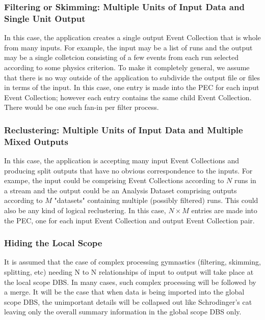 \documentclass{cmspaper}
\begin{document}
\subsubsection{Filtering or Skimming: Multiple Units of Input Data and Single 
Unit Output}

In this case, the application creates a single output Event Collection
that is whole from many inputs.  For example, the input may be a list
of runs and the output may be a single colletcion consisting of a few
events from each run selected according to some physics criterion.
To make it completely general, we assume that there is no way outside
of the application to subdivide the output file or files in terms of
the input.  In this case, one entry is made into the PEC for each input
Event Collection; however each entry contains the same child Event
Collection. There would be one such fan-in per filter process.

\subsubsection{Reclustering: Multiple Units of Input Data and Multiple Mixed Outputs}

In this case, the application is accepting many input Event Collections
and producing split outputs that have no obvious correspondence to the
inputs.  For exampe, the input could be comprising Event Collections
according to $N$ runs in a stream and the output could be an Analysis
Dataset comprising outputs according to $M$ "datasets" containing
multiple (possibly filtered) runs.  This could also be any kind of logical
reclustering.  In this case, $N \times M$ entries are made into the PEC,
one for each input Event Collection and output Event Collection pair.

\subsubsection{Hiding the Local Scope}

It is assumed that the case of complex processing gymnastics (filtering,
skimming, splitting, etc) needing N to N relationships of input to output
will take place at the local scope DBS.  In many cases, such complex
processing will be followed by a merge.  It will be the case that when
data is being imported into the global scope DBS, the unimportant details
will be collapsed out like Schrodinger's cat leaving only the overall
summary information in the global scope DBS only.
\end{document}
